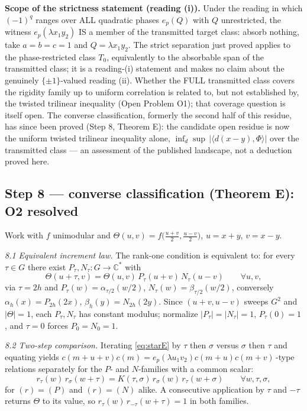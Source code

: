 \documentclass[11pt]{article}
\begin{document}
\textbf{Scope of the strictness statement (reading (i)).} Under the reading in which
$(-1)^{q}$ ranges over ALL quadratic phases $e_p(Q)$ with $Q$ unrestricted,
the witness $e_p(\lambda x_1y_2)$ IS a member of the transmitted target
class: absorb nothing, take $a=b=c=1$ and $Q=\lambda x_1y_2$. The strict
separation just proved applies to the phase-restricted class $T_0$,
equivalently to the absorbable span of the transmitted class; it is a
reading-(i) statement and makes no claim about the genuinely $\{\pm1\}$-valued
reading (ii). Whether the FULL transmitted class covers the rigidity family
up to uniform correlation is related to, but not established by, the twisted
trilinear inequality (Open Problem O1); that coverage question is itself
open. The converse classification, formerly the second half of this residue,
has since been proved (Step 8, Theorem E): the candidate open residue is now
the uniform twisted trilinear inequality alone,
$\inf_d\sup\,\bigl|\langle d(x-y),\Phi\rangle\bigr|$ over the transmitted
class — an assessment of the published landscape, not a deduction proved
here.

\subsection*{Step 8 --- converse classification (Theorem E): O2 resolved}

Work with $f$ unimodular and $\Theta(u,v)=f\bigl(\tfrac{u+v}{2},
\tfrac{u-v}{2}\bigr)$, $u=x+y$, $v=x-y$.

\emph{8.1 Equivalent increment law.} The rank-one condition is equivalent to:
for every $\tau\in G$ there exist $P_\tau,N_\tau:G\to\mathbb{C}^*$ with
\begin{equation}\label{eq:starE}
\Theta(u+\tau,v)=\Theta(u,v)\,P_\tau(u+v)\,N_\tau(u-v)\qquad\forall u,v,
\end{equation}
via $\tau=2h$ and $P_\tau(w)=\alpha_{\tau/2}(w/2)$,
$N_\tau(w)=\beta_{\tau/2}(w/2)$, conversely
$\alpha_h(x)=P_{2h}(2x)$, $\beta_h(y)=N_{2h}(2y)$. Since $(u+v,u-v)$ sweeps
$G^2$ and $|\Theta|=1$, each $P_\tau,N_\tau$ has constant modulus; normalize
$|P_\tau|=|N_\tau|=1$, $P_\tau(0)=1$, and $\tau=0$ forces $P_0=N_0=1$.

\emph{8.2 Two-step comparison.} Iterating \eqref{eq:starE} by $\tau$ then
$\sigma$ versus $\sigma$ then $\tau$ and equating yields
$c(m+u+v)c(m)=e_p(\lambda u_1v_2)c(m+u)c(m+v)\,$-type relations separately
for the $P$- and $N$-families with a common scalar:
\begin{equation}\label{eq:cocycleE}
r_\tau(w)\,r_\sigma(w+\tau)=K(\tau,\sigma)\,r_\sigma(w)\,r_\tau(w+\sigma)
\qquad\forall w,\tau,\sigma ,
\end{equation}
for $(r)=(P)$ and $(r)=(N)$ alike. A consecutive application by $\tau$ and
$-\tau$ returns $\Theta$ to its value, so
$r_\tau(w)\,r_{-\tau}(w+\tau)=1$ in both families.
\end{document}

